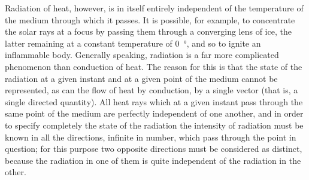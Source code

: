 \documentclass[12pt,oneside]{book}
\begin{document}
Radiation of heat, however, is in itself entirely independent of the temperature of the medium through which it passes. It is possible, for example, to concentrate the solar rays at a focus by passing them through a converging lens of ice, the latter remaining at a constant temperature of \SI{0}{\degree}, and so to ignite an inflammable body. Generally speaking, radiation is a far more complicated phenomenon than conduction of heat. The reason for this is that the state of the radiation at a given instant and at a given point of the medium cannot be represented, as can the flow of heat by conduction, by a single vector (that is, a single directed quantity). All heat rays which at a given instant pass through the same point of the medium are perfectly independent of one another, and in order to specify completely the state of the radiation the intensity of radiation must be known in all the directions, infinite in number, which pass through the point in question; for this purpose two opposite directions must be considered as distinct, because the radiation in one of them is quite independent of the radiation in the other. \par 
\end{document}
